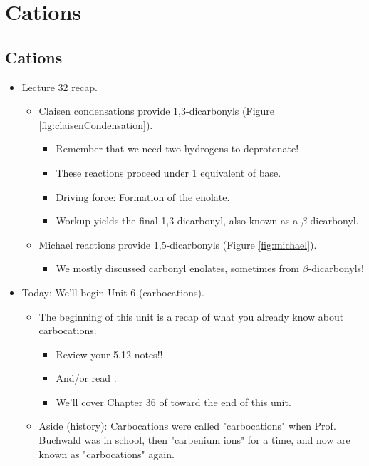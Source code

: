 \documentclass[../notes.tex]{subfiles}
\begin{document}
\chapter{Cations}
\setcounter{section}{32}
\section{Cations}
\begin{itemize}
    \item {}Lecture 32 recap.
    \begin{itemize}
        \item Claisen condensations provide 1,3-dicarbonyls (Figure \ref{fig:claisenCondensation}).
        \begin{itemize}
            \item Remember that we need two hydrogens to deprotonate!
            \item These reactions proceed under 1 equivalent of base.
            \item Driving force: Formation of the enolate.
            \item Workup yields the final 1,3-dicarbonyl, also known as a $\beta$-dicarbonyl.
        \end{itemize}
        \item Michael reactions provide 1,5-dicarbonyls (Figure \ref{fig:michael}).
        \begin{itemize}
            \item We mostly discussed carbonyl enolates, sometimes from $\beta$-dicarbonyls!
        \end{itemize}
    \end{itemize}
    \item Today: We'll begin Unit 6 (carbocations).
    \begin{itemize}
        \item The beginning of this unit is a recap of what you already know about carbocations.
        \begin{itemize}
            \item Review your 5.12 notes!!
            \item And/or read \textcite[333-339]{bib:Clayden}.
            \item We'll cover Chapter 36 of \textcite{bib:Clayden} toward the end of this unit.
        \end{itemize}
        \item Aside (history): Carbocations were called "carbocations" when Prof. Buchwald was in school, then "carbenium ions" for a time, and now are known as "carbocations" again.

\end{itemize}
\end{itemize}
\end{document}

